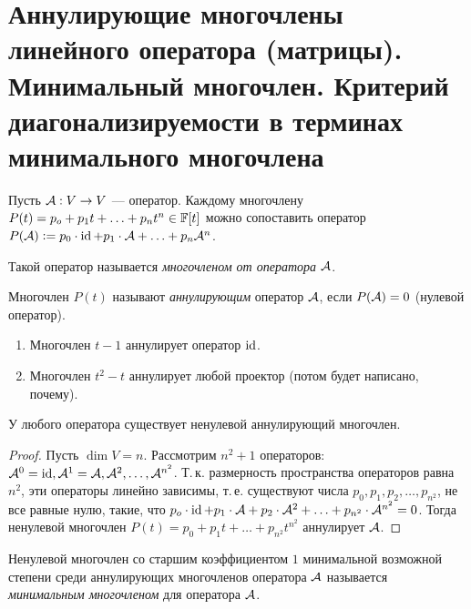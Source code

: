 \section{Аннулирующие многочлены линейного оператора (матрицы). Минимальный многочлен. Критерий диагонализируемости в терминах минимального многочлена}

Пусть $\mathcal{A}: V \to V$ --- оператор. Каждому многочлену $P(t) = p_o + p_1t + \ldots + p_nt^n \in \mathbb{F}[t]$ можно сопоставить оператор $P(\mathcal{A}) \vcentcolon = p_0 \cdot \operatorname{id} + p_1 \cdot \mathcal{A} + \ldots + p_n\mathcal{A}^n$.

\begin{definition}
    Такой оператор называется \textit{многочленом от оператора} $\mathcal{A}$.
\end{definition}

\begin{definition}
    Многочлен $P(t)$ называют \textit{аннулирующим} оператор $\mathcal{A}$, если $P(\mathcal{A}) = 0$ (нулевой оператор).
\end{definition}

\begin{example}
    \begin{enumerate}[nolistsep]
        \item Многочлен $t - 1$ аннулирует оператор $\operatorname{id}$.
        \item Многочлен $t^2 - t$ аннулирует любой проектор (потом будет написано, почему).
    \end{enumerate}
\end{example}

\begin{proposal}
    У любого оператора существует ненулевой аннулирующий многочлен.
\end{proposal}

\begin{proof}
    Пусть $\dim V = n$. Рассмотрим $n^2 + 1$ операторов: $\mathcal{A}^0 = \operatorname{id}, \mathcal{A}^1 = \mathcal{A}, \mathcal{A}^2, \ldots, \mathcal{A}^{n^2}$. Т.\,к. размерность пространства операторов равна $n^2$, эти операторы линейно зависимы, т.\,е. существуют числа $p_0, p_1, p_2, \ldots, p_{n^2}$, не все равные нулю, такие, что $p_o \cdot \operatorname{id} + p_1 \cdot \mathcal{A} + p_2 \cdot \mathcal{A}^2 + \ldots + p_{n^2} \cdot \mathcal{A}^{n^2} = 0$. Тогда ненулевой многочлен $P(t) = p_0 + p_1t + \ldots + p_{n^2}t^{n^2}$ аннулирует $\mathcal{A}$.
\end{proof}

\begin{definition}
    Ненулевой многочлен со старшим коэффициентом $1$ минимальной возможной степени среди аннулирующих многочленов оператора $\mathcal{A}$ называется \textit{минимальным многочленом} для оператора $\mathcal{A}$.
\end{definition}

